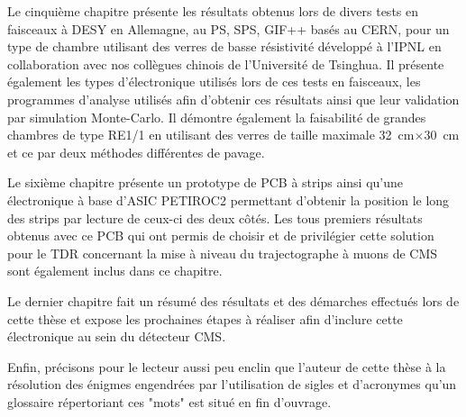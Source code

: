 Le cinquième chapitre présente les résultats obtenus lors de divers tests en faisceaux à DESY en Allemagne, au PS, SPS, GIF++ basés au CERN, pour un type de chambre utilisant des verres de basse résistivité développé à l'IPNL en collaboration avec nos collègues chinois de l'Université de Tsinghua. Il présente également les types d'électronique utilisés lors de ces tests en faisceaux, les programmes d'analyse utilisés afin d'obtenir ces résultats ainsi que leur validation par simulation Monte-Carlo. Il démontre également la faisabilité de grandes chambres de type RE1/1 en utilisant des verres de taille maximale \SI{32}{\centi\meter}$\times$\SI{30}{\centi\meter} et ce par deux méthodes différentes de pavage.

Le sixième chapitre présente un prototype de PCB à strips ainsi qu'une électronique à base d'ASIC PETIROC2 permettant d'obtenir la position le long des strips par lecture de ceux-ci des deux côtés. Les tous premiers résultats obtenus avec ce PCB qui ont permis de choisir et de privilégier cette solution pour le TDR concernant la mise à niveau du trajectographe à muons de CMS sont également inclus dans ce chapitre.

Le dernier chapitre fait un résumé des résultats et des démarches effectués lors de cette thèse et expose les prochaines étapes à réaliser afin d'inclure cette électronique au sein du détecteur CMS.

Enfin, précisons pour le lecteur aussi peu enclin que l'auteur de cette thèse à la résolution des énigmes engendrées par l'utilisation de sigles  et d'acronymes qu'un glossaire répertoriant ces "mots" est situé en fin d'ouvrage.


